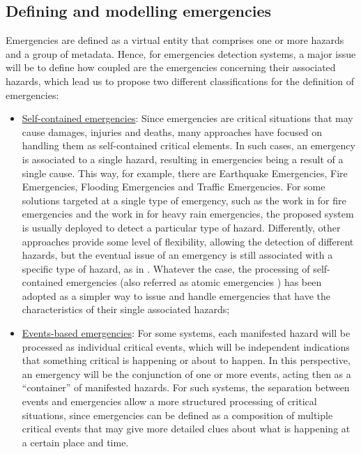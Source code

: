 \begin{refsection}
\subsection{Defining and modelling emergencies}

Emergencies are defined as a virtual entity that comprises one or more hazards and a group of metadata. Hence, for emergencies detection systems, a major issue will be to define how coupled are the emergencies concerning their associated hazards, which lead us to propose two different classifications for the definition of emergencies:

\begin{itemize}
  \item \underline{Self-contained emergencies}: Since emergencies are critical situations that may cause damages, injuries and deaths, many approaches have focused on handling them as self-contained critical elements. In such cases, an emergency is associated to a single hazard, resulting in emergencies being a result of a single cause. This way, for example, there are Earthquake Emergencies, Fire Emergencies, Flooding Emergencies and Traffic Emergencies. For some solutions targeted at a single type of emergency, such as the work in \cite{iotFire1} for fire emergencies and the work in \cite{iotRain1} for heavy rain emergencies, the proposed system is usually deployed to detect a particular type of hazard. Differently, other approaches provide some level of flexibility, allowing the detection of different hazards, but the eventual issue of an emergency is still associated with a specific type of hazard, as in \cite{emergenciesmetric4}. Whatever the case, the processing of self-contained emergencies (also referred as atomic emergencies \cite{emergenciesmetric6}) has been adopted as a simpler way to issue and handle emergencies that have the characteristics of their single associated hazards;
  
  \item \underline{Events-based emergencies}: For some systems, each manifested hazard will be processed as individual critical events, which will be independent indications that something critical is happening or about to happen. In this perspective, an emergency will be the conjunction of one or more events, acting then as a ``container'' of manifested hazards. For such systems, the separation between events and emergencies allow a more structured processing of critical situations, since emergencies can be defined as a composition of multiple critical events that may give more detailed clues about what is happening at a certain place and time.
\end{itemize}


\end{refsection}
